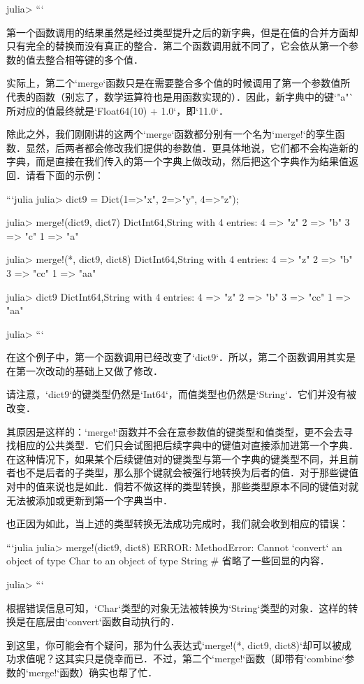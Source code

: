 julia> 
```

第一个函数调用的结果虽然是经过类型提升之后的新字典，但是在值的合并方面却只有完全的替换而没有真正的整合．第二个函数调用就不同了，它会依从第一个参数的值去整合相等键的多个值．

实际上，第二个`merge`函数只是在需要整合多个值的时候调用了第一个参数值所代表的函数（别忘了，数学运算符也是用函数实现的）．因此，新字典中的键`"a"`所对应的值最终就是`Float64(10) + 1.0`，即`11.0`．

除此之外，我们刚刚讲的这两个`merge`函数都分别有一个名为`merge!`的孪生函数．显然，后两者都会修改我们提供的参数值．更具体地说，它们都不会构造新的字典，而是直接在我们传入的第一个字典上做改动，然后把这个字典作为结果值返回．请看下面的示例：

```julia
julia> dict9 = Dict(1=>"x", 2=>"y", 4=>"z");

julia> merge!(dict9, dict7)
Dict{Int64,String} with 4 entries:
  4 => "z"
  2 => "b"
  3 => "c"
  1 => "a"

julia> merge!(*, dict9, dict8)
Dict{Int64,String} with 4 entries:
  4 => "z"
  2 => "b"
  3 => "cc"
  1 => "aa"

julia> dict9
Dict{Int64,String} with 4 entries:
  4 => "z"
  2 => "b"
  3 => "cc"
  1 => "aa"

julia> 
```

在这个例子中，第一个函数调用已经改变了`dict9`．所以，第二个函数调用其实是在第一次改动的基础上又做了修改．

请注意，`dict9`的键类型仍然是`Int64`，而值类型也仍然是`String`．它们并没有被改变．

其原因是这样的：`merge!`函数并不会在意参数值的键类型和值类型，更不会去寻找相应的公共类型．它们只会试图把后续字典中的键值对直接添加进第一个字典．在这种情况下，如果某个后续键值对的键类型与第一个字典的键类型不同，并且前者也不是后者的子类型，那么那个键就会被强行地转换为后者的值．对于那些键值对中的值来说也是如此．倘若不做这样的类型转换，那些类型原本不同的键值对就无法被添加或更新到第一个字典当中．

也正因为如此，当上述的类型转换无法成功完成时，我们就会收到相应的错误：

```julia
julia> merge!(dict9, dict8)
ERROR: MethodError: Cannot `convert` an object of type Char to an object of type String
# 省略了一些回显的内容．

julia> 
```

根据错误信息可知，`Char`类型的对象无法被转换为`String`类型的对象．这样的转换是在底层由`convert`函数自动执行的．

到这里，你可能会有个疑问，那为什么表达式`merge!(*, dict9, dict8)`却可以被成功求值呢？这其实只是侥幸而已．不过，第二个`merge!`函数（即带有`combine`参数的`merge!`函数）确实也帮了忙．


